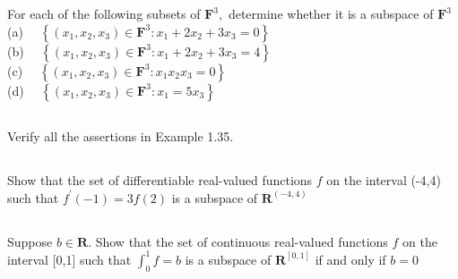 \documentclass[a4paper]{article}
\begin{document}
\section{}
\subsection{}
For each of the following subsets of $\mathbf{F}^{3},$ determine whether it is a subspace of $\mathbf{F}^{3}$\\
(a) $\quad\left\{\left(x_{1}, x_{2}, x_{3}\right) \in \mathbf{F}^{3}: x_{1}+2 x_{2}+3 x_{3}=0\right\}$ \\
(b) $\quad\left\{\left(x_{1}, x_{2}, x_{3}\right) \in \mathbf{F}^{3}: x_{1}+2 x_{2}+3 x_{3}=4\right\}$\\
(c) $\quad\left\{\left(x_{1}, x_{2}, x_{3}\right) \in \mathbf{F}^{3}: x_{1} x_{2} x_{3}=0\right\}$\\
(d) $\quad\left\{\left(x_{1}, x_{2}, x_{3}\right) \in \mathbf{F}^{3}: x_{1}=5 x_{3}\right\}$
\paragraph{}

\subsection{}
Verify all the assertions in Example 1.35.
\paragraph{}

\subsection{}
Show that the set of differentiable real-valued functions $f$ on the interval (-4,4) such that $f^{\prime}(-1)=3 f(2)$ is a subspace of $\mathbf{R}^{(-4,4)}$
\paragraph{}

\subsection{}
Suppose $b \in \mathbf{R} .$ Show that the set of continuous real-valued functions $f$ on the interval [0,1] such that $\int_{0}^{1} f=b$ is a subspace of $\mathbf{R}^{[0,1]}$ if and only if $b=0$
\paragraph{}
\end{document}
